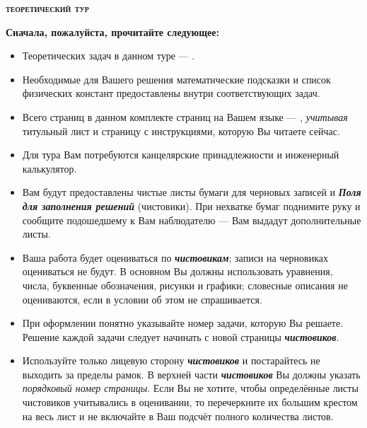 \thispagestyle{empty}%
%
\begin{center}
    \LARGE\textbf{\scshape{теоретический тур}}
\end{center}
%
\vspace{2pt}%
%
\begin{center}
    \large{}
\end{center}
\vspace{2pt}
\begin{center}
    \large\textbf{Сначала, пожалуйста, прочитайте следующее:}
\end{center}
\vspace{4pt}

\begin{itemize}[leftmargin=*]
    \item Теоретических задач в данном туре --- .
    \item Необходимые для Вашего решения математические подсказки и список физических констант предоставлены внутри соответствующих задач.
    \item Всего страниц в данном комплекте страниц на Вашем языке ---  \pageref{LastPage}, \textit{учитывая} титульный лист и страницу с инструкциями, которую Вы читаете сейчас.
    \item Для тура Вам потребуются канцелярские принадлежности и инженерный калькулятор.
    \item Вам будут предоставлены чистые листы бумаги для черновых записей и \textbf{\textit{Поля для заполнения решений}} (чистовики). При нехватке бумаг поднимите руку и сообщите подошедшему к Вам наблюдателю --- Вам выдадут дополнительные листы.
    \item Ваша работа будет оцениваться по \textbf{\textit{чистовикам}}; записи на черновиках оцениваться не будут. В основном Вы должны использовать уравнения, числа, буквенные обозначения, рисунки и графики; словесные описания не оцениваются, если в условии об этом не спрашивается.
    \item При оформлении понятно указывайте номер задачи, которую Вы решаете. Решение каждой задачи следует начинать с новой страницы \textbf{\textit{чистовиков}}.
    \item Используйте только лицевую сторону \textbf{\textit{чистовиков}} и постарайтесь не выходить за пределы рамок. В верхней части \textbf{\textit{чистовиков}} Вы должны указать \textit{порядковый номер страницы}. Если Вы не хотите, чтобы определённые листы чистовиков учитывались в оценивании, то перечеркните их большим крестом на весь лист и не включайте в Ваш подсчёт полного количества листов.

\end{itemize}
